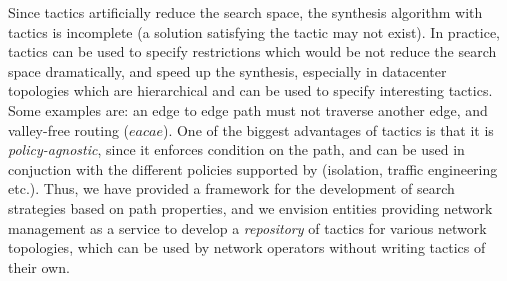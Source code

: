  Since tactics artificially reduce the search space, the synthesis algorithm with tactics is incomplete (a solution satisfying the tactic may not exist). 
 In practice, tactics can be used to specify restrictions which would be not reduce the search space dramatically, 
 and speed up the synthesis, especially in datacenter topologies which are hierarchical 
 and can be used to specify interesting tactics. Some examples are: an edge to edge path must not
 traverse another edge, and valley-free routing ($eacae$). One of the biggest advantages
 of tactics is that it is \emph{policy-agnostic}, since it enforces condition on the path, and
 can be used in conjuction with the different policies supported by \name (isolation, traffic engineering etc.).  
 Thus, we have provided a framework for the
 development of search strategies based on path properties, and we envision entities providing network
 management as a service to develop a \emph{repository} of tactics for various network topologies, 
 which can be used by network operators without writing tactics of their own. 

